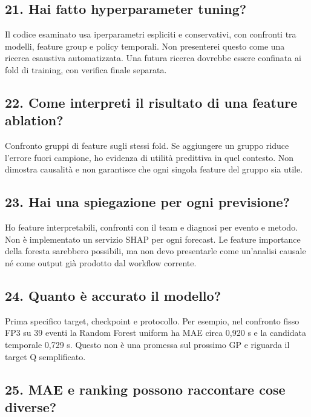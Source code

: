 \documentclass[11pt,a4paper]{article}
\begin{document}
\subsection{21. Hai fatto hyperparameter tuning?}\label{hai-fatto-hyperparameter-tuning}

Il codice esaminato usa iperparametri espliciti e conservativi, con confronti tra modelli, feature group e policy temporali. Non presenterei questo come una ricerca esaustiva automatizzata. Una futura ricerca dovrebbe essere confinata ai fold di training, con verifica finale separata.

\subsection{22. Come interpreti il risultato di una feature ablation?}\label{come-interpreti-il-risultato-di-una-feature-ablation}

Confronto gruppi di feature sugli stessi fold. Se aggiungere un gruppo riduce l'errore fuori campione, ho evidenza di utilità predittiva in quel contesto. Non dimostra causalità e non garantisce che ogni singola feature del gruppo sia utile.

\subsection{23. Hai una spiegazione per ogni previsione?}\label{hai-una-spiegazione-per-ogni-previsione}

Ho feature interpretabili, confronti con il team e diagnosi per evento e metodo. Non è implementato un servizio SHAP per ogni forecast. Le feature importance della foresta sarebbero possibili, ma non devo presentarle come un'analisi causale né come output già prodotto dal workflow corrente.

\subsection{24. Quanto è accurato il modello?}\label{quanto-uxe8-accurato-il-modello}

Prima specifico target, checkpoint e protocollo. Per esempio, nel confronto fisso FP3 su 39 eventi la Random Forest uniform ha MAE circa 0,920 s e la candidata temporale 0,729 s. Questo non è una promessa sul prossimo GP e riguarda il target Q semplificato.

\subsection{25. MAE e ranking possono raccontare cose diverse?}\label{mae-e-ranking-possono-raccontare-cose-diverse}
\end{document}
